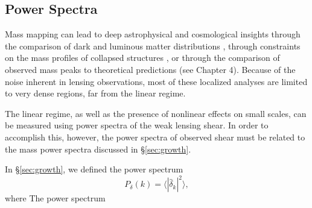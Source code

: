 \subsection{Power Spectra}
Mass mapping can lead to deep astrophysical and cosmological insights through
the comparison of dark and luminous matter distributions
\citep[e.g.][]{Clowe2006}, through constraints on the mass profiles of
collapsed structures \citep[e.g.][]{Oguri2012}, or
through the comparison of observed mass peaks to
theoretical predictions (see Chapter 4).  Because of the noise inherent in
lensing observations, most of these localized analyses are limited to
very dense regions, far from the linear regime.

The linear regime, as well as the presence of nonlinear effects on small
scales, can be measured using power spectra of the weak lensing shear.  In
order to accomplish this, however, the power spectra of observed shear must
be related to the mass power spectra discussed in \S\ref{sec:growth}.

In \S\ref{sec:growth}, we defined the power spectrum
\begin{equation}
  P_\delta(k) = \langle |\hat\delta_k|^2 \rangle,
\end{equation}
where
The power spectrum 

